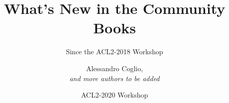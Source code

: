 \documentclass{beamer}
\newcommand{\code}[1]{\texttt{#1}}
\newcommand{\bookpath}[1]{\textbf{\code{#1}}}
\newcommand{\newlibtitle}{\frametitle{New Libraries}}
\newcommand{\implibtitle}{\frametitle{Improved Libraries}}
\newcommand{\separation}{\vspace*{1.5ex}}
\begin{document}

\title{What's New in the Community Books}

\subtitle{Since the ACL2-2018 Workshop}

\author{Alessandro Coglio, \\
        \textit{and more authors to be added}}


\date{ACL2-2020 Workshop}




















\end{document}
